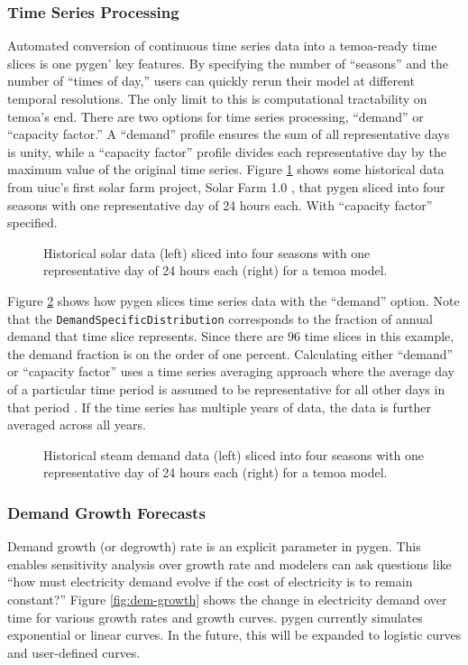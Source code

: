 \subsubsection{Time Series Processing}
Automated conversion of continuous time series data into a \gls{temoa}-ready
time slices is one \gls{pygen}' key features. By specifying the number of ``seasons''
and the number of ``times of day,'' users can quickly rerun their model at different
temporal resolutions. The only limit to this is computational tractability on \gls{temoa}'s
end. There are two options for time series processing, ``demand'' or ``capacity factor.''
A ``demand'' profile ensures the sum of all representative days is unity, while
a ``capacity factor'' profile divides each representative day by the maximum value
of the original time series.
Figure \ref{fig:solar-timeslice} shows some historical data from \gls{uiuc}'s
first solar farm project, Solar Farm 1.0 \cite{white_solar_2017}, that \gls{pygen}
sliced into four seasons with one representative day of 24 hours each. With ``capacity factor''
specified.
\begin{figure}[H]
  \resizebox{\textwidth}{!}{}
  \caption{Historical solar data (left) sliced into four seasons with one
  representative day of 24 hours each (right) for a \gls{temoa} model.}
  \label{fig:solar-timeslice}
\end{figure}

Figure \ref{fig:steam-timeslice} shows how \gls{pygen} slices time series
data with the ``demand'' option. Note that the \texttt{DemandSpecificDistribution}
corresponds to the fraction of annual demand that time slice represents. Since
there are 96 time slices in this example, the demand fraction is on the order of one
percent. Calculating either ``demand'' or ``capacity factor'' uses a time series
averaging approach where the average day of a particular time period is assumed
to be representative for all other days in that period \cite{kotzur_impact_2018}.
If the time series has multiple years of data, the data is further averaged
across all years.

\begin{figure}[H]
  \resizebox{\textwidth}{!}{}
  \caption{Historical steam demand data (left) sliced into four seasons with one
  representative day of 24 hours each (right) for a \gls{temoa} model.}
  \label{fig:steam-timeslice}
\end{figure}

\subsubsection{Demand Growth Forecasts}
Demand growth (or degrowth) rate is an explicit parameter in \gls{pygen}. This
enables sensitivity analysis over growth rate and modelers can ask questions like
``how must electricity demand evolve if the cost of electricity is to remain
constant?'' Figure \ref{fig:dem-growth} shows the change in electricity demand
over time for various growth rates and growth curves. \gls{pygen} currently simulates
exponential or linear curves. In the future, this will be expanded to logistic curves
and user-defined curves.

